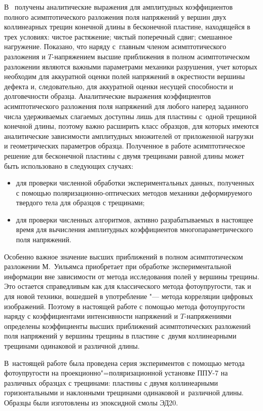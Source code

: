 В~\cite{Stepanova2016} получены аналитические выражения для амплитудных коэффициентов полного асимптотического разложения поля напряжений у вершин двух коллинеарных трещин конечной длины в бесконечной пластине, находящейся в трех условиях: чистое растяжение; чистый поперечный сдвиг;  смешанное нагружение. 
Показано, что наряду с~главным членом асимптотического разложения и $T$-напряжением высшие приближения в полном асимптотическом разложении являются важными параметрами механики разрушения, учет которых необходим для аккуратной оценки полей напряжений в окрестности вершины дефекта и, следовательно, для аккуратной оценки несущей способности и долговечности образца. Аналитические выражения коэффициентов асимптотического разложения поля напряжений для любого наперед заданного числа удерживаемых слагаемых доступны лишь для пластины с~одной трещиной конечной длины, поэтому важно расширить класс образцов, для которых имеются аналитические зависимости амплитудных множителей от приложенной нагрузки и геометрических параметров образца. Полученное в работе асимптотическое решение для бесконечной пластины с двумя трещинами равной длины может быть использовано в следующих случаях:
\begin{itemize}
\item[1)]  для проверки численной обработки экспериментальных данных, полученных с помощью поляризационно-оптических методов механики деформируемого твердого тела для образцов с трещинами; 
\item[2)]  для  проверки численных алгоритмов, активно разрабатываемых в настоящее время для вычисления амплитудных коэффициентов многопараметрического поля напряжений.

\end{itemize}

Особенно важное значение  высших приближений в полном асимптотическом разложении М.~Уильямса приобретает при обработке экспериментальной информации вне зависимости от метода исследования полей у вершины трещины. 
Это остается справедливым как для классического метода фотоупругости, так и для новой техники, вошедшей в употребление "--- метода корреляции цифровых изображений.
Поэтому в настоящей работе с помощью метода фотоупругости наряду с коэффициентами интенсивности напряжений и $T$-напряжениями определены коэффициенты высших приближений асимптотических разложений поля напряжений у вершины трещины в пластине с~двумя коллинеарными трещинами одинаковой и различной длины.

\smallskip

 В~настоящей работе  была проведена серия  экспериментов с помощью метода фотоупругости на проекционно"=поляризационной установке ППУ-7 на различных образцах с трещинами: пластины с двумя коллинеарными горизонтальными и наклонными трещинами  одинаковой и~различной длины. 
Образцы были изготовлены из эпоксидной смолы ЭД20.


